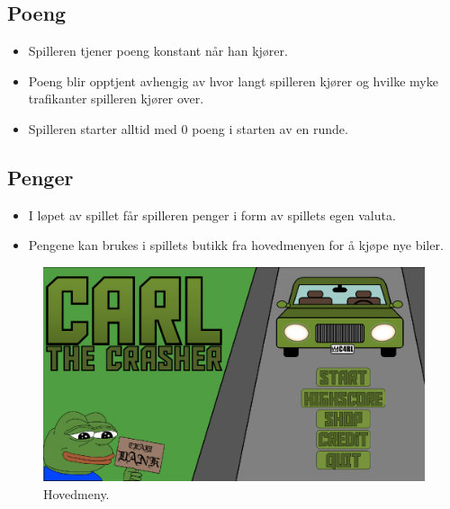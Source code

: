 \documentclass[paper=a4]{article}
\begin{document}
		\subsection{Poeng}
		\begin{itemize}
			\item{Spilleren tjener poeng konstant når han kjører.}
			\item{Poeng blir opptjent avhengig av hvor langt spilleren kjører og hvilke myke trafikanter spilleren kjører over.}
			\item{Spilleren starter alltid med 0 poeng i starten av en runde.}
		\end{itemize}

		\subsection{Penger}
		\begin{itemize}
			\item{I løpet av spillet får spilleren penger i form av spillets egen valuta.}
			\item{Pengene kan brukes i spillets butikk fra hovedmenyen for å kjøpe nye biler.}
		\end{itemize}

	\newpage
	\begin{figure}\begin{center}
		\includegraphics[width=1.00\textwidth]{images/main_menu.PNG}
		\caption{Hovedmeny.}
	\end{center}\end{figure}
\end{document}
